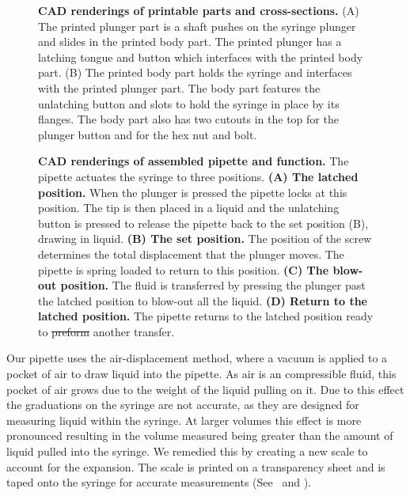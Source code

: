 \documentclass[10pt,letterpaper]{article}
\providecommand{\DIFaddtex}[1]{{\protect\color{blue}\uwave{#1}}} %
\providecommand{\DIFdeltex}[1]{{\protect\color{red}\sout{#1}}}                      %
\providecommand{\DIFaddFL}[1]{\DIFadd{#1}} %
\providecommand{\DIFdelFL}[1]{\DIFdel{#1}} %
\providecommand{\DIFaddbeginFL}{} %
\providecommand{\DIFaddendFL}{} %
\providecommand{\DIFdelbeginFL}{} %
\providecommand{\DIFdelendFL}{} %
\providecommand{\DIFadd}[1]{\texorpdfstring{\DIFaddtex{#1}}{#1}} %
\providecommand{\DIFdel}[1]{\texorpdfstring{\DIFdeltex{#1}}{}} %
\begin{document}
\begin{figure}
	\caption{
		{\bf CAD renderings of printable parts and cross-sections.} (A) The printed plunger part is a shaft pushes on the syringe plunger and slides in the printed body part. The printed plunger has a latching tongue and button which interfaces with the printed body part. (B) The printed body part holds the syringe and interfaces with the printed plunger part. The body part features the unlatching button and slots to hold the syringe in place by its flanges. The body part also has two cutouts in the top for the plunger button and for the hex nut and bolt.
	}
	\label{fig1}
\end{figure}

\begin{figure}
	\caption{
		{\bf CAD renderings of assembled pipette and function.} The pipette actuates the syringe to three positions. {\bf (A) The latched position.} When the plunger is pressed the pipette locks at this position. The tip is then placed in a liquid and the unlatching button is pressed to release the pipette back to the set position (B), drawing in liquid.  {\bf(B) The set position.} The position of the screw determines the total displacement that the plunger moves. The pipette is spring loaded to return to this position. {\bf (C) The blow-out position.} The fluid is transferred by pressing the plunger past the latched position to blow-out all the liquid. {\bf (D) Return to the latched position.} The pipette returns to the latched position ready to \DIFdelbeginFL \DIFdelFL{preform }\DIFdelendFL \DIFaddbeginFL \DIFaddFL{perform }\DIFaddendFL another transfer.
	}
	\label{fig2}
\end{figure}

Our pipette uses the air-displacement method, where a vacuum is applied to a pocket of air to draw liquid into the pipette.
As air is an compressible fluid, this pocket of air grows due to the weight of the liquid pulling on it.
Due to this effect the graduations on the syringe are not accurate, as they are designed for measuring liquid within the syringe.
At larger volumes this effect is more pronounced resulting in the volume measured being greater than the amount of liquid pulled into the syringe.
We remedied this by creating a new scale to account for the expansion.
The scale is printed on a transparency sheet and is taped onto the syringe for accurate measurements (See~ and ).
\end{document}
